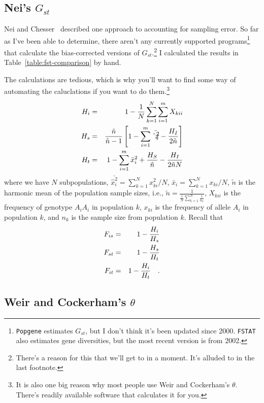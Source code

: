 \subsection*{Nei's $G_{st}$}

Nei and Chesser~\cite{Nei-Chesser-1983} described one approach to
accounting for sampling error. So far as I've been able to determine,
there aren't any currently supported programs\footnote{{\tt Popgene}
  estimates $G_{st}$, but I don't think it's been updated since
  2000. {\tt FSTAT} also estimates gene diversities, but the most
  recent version is from 2002.}
that calculate the bias-corrected versions of
$G_{st}$.\footnote{There's a reason for this that we'll get to in a
  moment. It's alluded to in the last footnote.} I calculated the
results in Table~\ref{table:fst-comparison} by hand.

The calculations are tedious, which is why you'll want to find some
way of automating the caluclations if you want to do them.\footnote{It
  is also one big reason why most people use Weir and Cockerham's
  $\theta$. There's readily available software that calculates it for
  you.}
\begin{eqnarray*}
H_{i} &=& 1 - {1 \over N} \sum_{k=1}^{N} \sum_{i=1}^{m} {X_{kii}} \\
H_{s} &=& {\tilde n \over {\tilde n - 1}}
         \left[1 - \sum_{i=1}^{m} {\bar {\hat x_{i}^{2}}} 
         - {H_{I} \over {2 \tilde n}}\right] \\
H_{t} &=& 1 - \sum_{i=1}^{m} {\bar x_{i}^{2}} + {H_{S} \over {\tilde n}}
         - {H_{I} \over {2 \tilde n N}} 
\end{eqnarray*}
where we have $N$ subpopulations, 
${\bar {\hat x_{i}^{2}}} = \sum_{k=1}^{N} {x_{ki}^{2}}/N$, 
${\bar x_{i}} = \sum_{k=1}^{N} x_{ki}/N$, $\tilde n$ 
is the harmonic mean of the population sample sizes, i.e.,
$ \tilde n = \frac{1}{\frac{1}{N} \sum_{k=1}^{N} \frac{1}{n_k}}$, 
$X_{kii}$ is the frequency of genotype $A_{i}A_{i}$ in population $k$,  
$x_{ki}$ is the frequency of allele $A_{i}$ in population $k$, and $n_k$ is
the sample size from population $k$.  Recall that
\begin{eqnarray*}
F_{is} &=& 1 - {H_{i} \over H_{s}} \\
F_{st} &=& 1 - {H_{s} \over H_{t}} \\
F_{it} &=& 1 - {H_{i} \over H_{t}} \quad .
\end{eqnarray*}

\subsection*{Weir and Cockerham's $\theta$}

